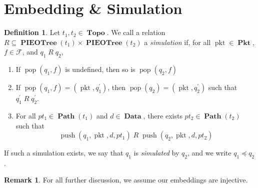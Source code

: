 \documentclass{amsart}
\DeclareMathOperator{\pkt}{\mathrm{pkt}}
\DeclareMathOperator{\push}{\mathrm{push}}
\DeclareMathOperator{\pop}{\mathrm{pop}}
\DeclareMathOperator{\Pkt}{\mathbf{Pkt}}
\DeclareMathOperator{\Data}{\mathbf{Data}}
\DeclareMathOperator{\Topo}{\mathbf{Topo}}
\DeclareMathOperator{\Path}{\mathbf{Path}}
\DeclareMathOperator{\PIEOTree}{\mathbf{PIEOTree}}
\theoremstyle{definition}
\newtheorem{dfn}[thm]{Definition}
\newtheorem{rem}[thm]{Remark}
\begin{document}
\section{Embedding \& Simulation}

\begin{dfn}
    \label{dfn:sim}
    Let $t_1, t_2 \in \Topo$. 
    We call a relation $R \subseteq \PIEOTree(t_1) \times \PIEOTree(t_2)$ a \emph{simulation} if, 
    for all $\pkt \in \Pkt$, $f \in \mathcal F$, and $q_1 \; R \; q_2$,
    \begin{enumerate}
        \item If $\pop(q_1, f)$ is undefined, then so is $\pop(q_2, f)$
        \item If $\pop(q_1, f) = (\pkt, q_1^\prime)$, then $\pop(q_2) = (\pkt, q_2^\prime)$ such that $q_1^\prime \; R \; q_2^\prime$.
        \item For all $pt_1 \in \Path(t_1)$ and $d \in \Data$, there exists $pt_2 \in \Path(t_2)$ such that
            $$\push(q_1, \pkt, d, pt_1) \; R \; \push(q_2, \pkt, d, pt_2)$$
    \end{enumerate}
    If such a simulation exists, we say that $q_1$ is \emph{simulated} by $q_2$, and we write $q_1 \preccurlyeq q_2$.
\end{dfn}

\begin{rem}
    For all further discussion, we assume our embeddings are injective.
\end{rem}
\end{document}
